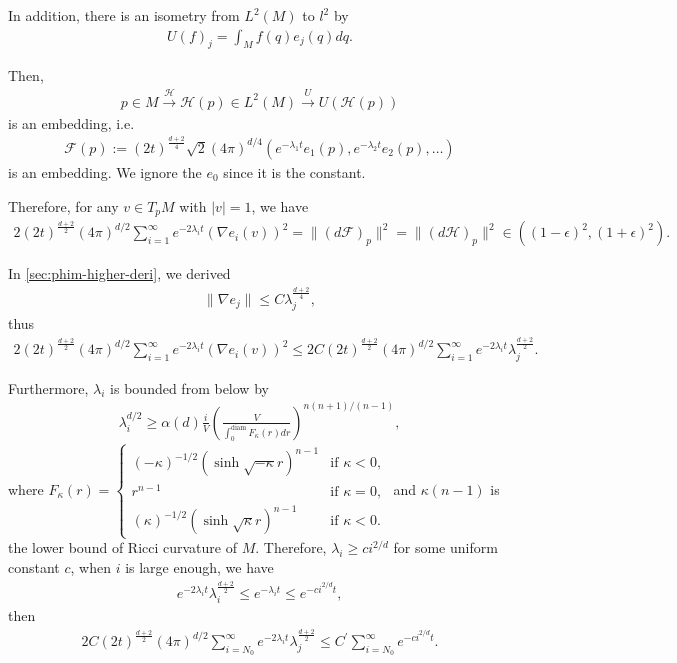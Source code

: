 In addition, there is an isometry from $L^2(M)$ to $l^2$ by
\begin{align}
	U(f)_j=\int_M f(q) e_j(q) dq.
\end{align}

Then,
\begin{align}
	p\in M \overset{\mathcal{H}}{\rightarrow} \mathcal{H}(p) \in L^2(M) \overset{U}{\rightarrow} U(\mathcal{H}(p))
\end{align}
is an embedding, i.e.
\begin{align}
	\mathcal{F}(p) := (2t)^{\frac{d+2}{4}}\sqrt{2}(4\pi)^{d/4} \left(e^{-\lambda_1 t} e_1(p),e^{-\lambda_2 t} e_2(p),\dots\right)
\end{align}
is an embedding. We ignore the $e_0$ since it is the constant.

Therefore, for any $v \in T_p M$ with $|v|=1$, we have
\begin{align}
	2 (2t)^\frac{d+2}{2}(4\pi)^{d/2} \sum_{i=1}^{\infty} e^{-2\lambda_i t} (\nabla e_i (v))^2 = \|(d\mathcal{F})_p\|^2= \|(d\mathcal{H})_p\|^2 \in \left((1-\epsilon)^2,(1+\epsilon)^2\right).
\end{align}

In \cref{sec:phim-higher-deri}, we derived 
\begin{align}
	\|\nabla e_j\| \leq C \lambda_j^{\frac{d+2}{4}},
\end{align}
thus 
\begin{align}
2 (2t)^\frac{d+2}{2}(4\pi)^{d/2} \sum_{i=1}^{\infty} e^{-2\lambda_i t} (\nabla e_i (v))^2 \leq 2C (2t)^\frac{d+2}{2}(4\pi)^{d/2} \sum_{i=1}^{\infty} e^{-2\lambda_i t}  \lambda_j^{\frac{d+2}{2}}.
\end{align}

Furthermore, $\lambda_i$ is bounded from below by
\begin{align}
	\lambda_i ^ {d/2} \geq \alpha(d) \frac{i}{V} \left(\frac{V}{\int_{0}^{\text{diam}} F_\kappa(r)dr}\right)^{n(n+1)/(n-1)},
\end{align}
where $F_\kappa(r) = \begin{cases} 
	(-\kappa)^{-1/2} (\sinh \sqrt{-\kappa} r)^{n-1} & \text{if } \kappa<0, \\
	r^{n-1} & \text{if } \kappa = 0, \\
	(\kappa)^{-1/2} (\sinh \sqrt{\kappa} r)^{n-1} & \text{if } \kappa<0.
\end{cases}$ and $\kappa(n-1)$ is the lower bound of Ricci curvature of $M$\cite{Cheng1981}. Therefore, $\lambda_i \geq c i^{2/d}$ for some uniform constant $c$, when $i$ is large enough, we have 
\begin{align}
	e^{-2\lambda_it} \lambda_i^ {\frac{d+2}{2}} \leq e^{-\lambda_i t} \leq e^{-c i^{2/d} t},
\end{align}
then
\begin{align}
2C (2t)^\frac{d+2}{2}(4\pi)^{d/2} \sum_{i=N_0}^{\infty} e^{-2\lambda_i t}  \lambda_j^{\frac{d+2}{2}} \leq C^\prime \sum_{i=N_0}^{\infty} e^{-c i^{2/d} t}.
\end{align}


